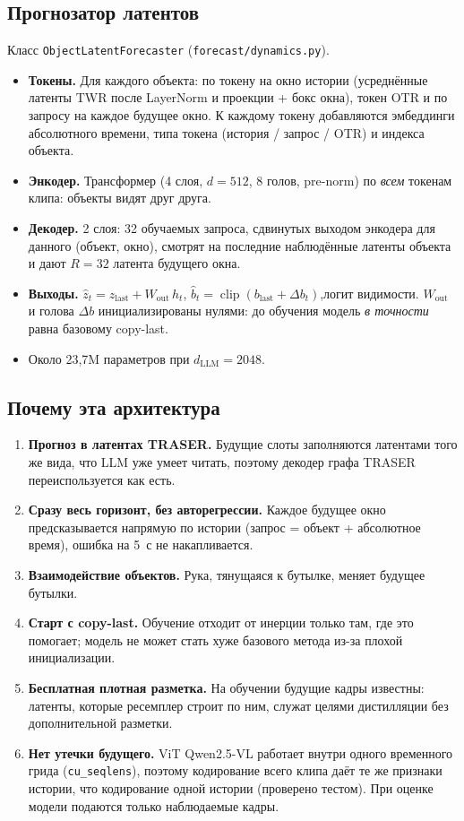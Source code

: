 \documentclass[11pt,a4paper]{article}
\newcommand{\code}[1]{\texttt{#1}}
\begin{document}
\subsection{Прогнозатор латентов}
Класс \code{ObjectLatentForecaster} (\code{forecast/dynamics.py}).
\begin{itemize}
  \item \textbf{Токены.} Для каждого объекта: по токену на окно истории
        (усреднённые латенты TWR после LayerNorm и проекции + бокс окна), токен OTR и по запросу на
        каждое будущее окно. К каждому токену добавляются эмбеддинги абсолютного времени, типа
        токена (история / запрос / OTR) и индекса объекта.
  \item \textbf{Энкодер.} Трансформер (4 слоя, $d=512$, 8 голов, pre-norm) по \emph{всем}
        токенам клипа: объекты видят друг друга.
  \item \textbf{Декодер.} 2 слоя: 32 обучаемых запроса, сдвинутых выходом энкодера для
        данного (объект, окно), смотрят на последние наблюдённые латенты объекта и дают
        $R=32$ латента будущего окна.
  \item \textbf{Выходы.}
        $\hat z_{t} = z_{\text{last}} + W_{\text{out}}\,h_t$,\quad
        $\hat b_t = \operatorname{clip}(b_{\text{last}} + \Delta b_t)$,\quad логит видимости.
        $W_{\text{out}}$ и голова $\Delta b$ инициализированы нулями: до обучения модель
        \emph{в точности} равна базовому copy-last.
  \item Около 23,7M параметров при $d_{\text{LLM}}=2048$.
\end{itemize}

\subsection{Почему эта архитектура}
\begin{enumerate}
  \item \textbf{Прогноз в латентах TRASER.} Будущие слоты заполняются латентами того же вида,
        что LLM уже умеет читать, поэтому декодер графа TRASER переиспользуется как есть.
  \item \textbf{Сразу весь горизонт, без авторегрессии.} Каждое будущее окно предсказывается
        напрямую по истории (запрос = объект + абсолютное время), ошибка на 5~с не накапливается.
  \item \textbf{Взаимодействие объектов.} Рука, тянущаяся к бутылке, меняет будущее бутылки.
  \item \textbf{Старт с copy-last.} Обучение отходит от инерции только там, где это помогает;
        модель не может стать хуже базового метода из-за плохой инициализации.
  \item \textbf{Бесплатная плотная разметка.} На обучении будущие кадры известны: латенты,
        которые ресемплер строит по ним, служат целями дистилляции без дополнительной разметки.
  \item \textbf{Нет утечки будущего.} ViT Qwen2.5-VL работает внутри одного временного грида
        (\code{cu\_seqlens}), поэтому кодирование всего клипа даёт те же признаки истории, что
        кодирование одной истории (проверено тестом). При оценке модели подаются только
        наблюдаемые кадры.
\end{enumerate}
\end{document}
